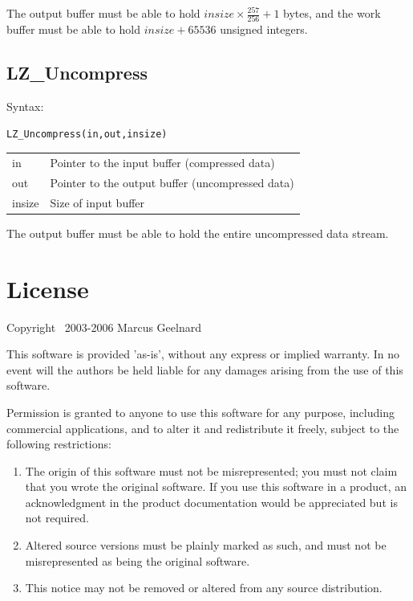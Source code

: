 \documentclass[a4paper,11pt,oneside]{report}
\begin{document}
The output buffer must be able to hold $insize\times\frac{257}{256}+1$ bytes,
and the work buffer must be able to hold $insize+65536$ unsigned
integers.


\section{LZ\_Uncompress}
Syntax:
\begin{lstlisting}
LZ_Uncompress(in,out,insize)
\end{lstlisting}

\begin{tabular}{ll}
in      & Pointer to the input buffer (compressed data)\\
out     & Pointer to the output buffer (uncompressed data)\\
insize  & Size of input buffer
\end{tabular}

The output buffer must be able to hold the entire uncompressed data
stream.


\chapter{License}
\thispagestyle{fancy}
Copyright \textcopyright\ 2003-2006 Marcus Geelnard

This software is provided 'as-is', without any express or implied
warranty. In no event will the authors be held liable for any damages
arising from the use of this software.

Permission is granted to anyone to use this software for any purpose,
including commercial applications, and to alter it and redistribute it
freely, subject to the following restrictions:

\begin{enumerate}
\item The origin of this software must not be misrepresented; you must not
   claim that you wrote the original software. If you use this software
   in a product, an acknowledgment in the product documentation would
   be appreciated but is not required.

\item Altered source versions must be plainly marked as such, and must not
   be misrepresented as being the original software.

\item This notice may not be removed or altered from any source
   distribution.
\end{enumerate}
\end{document}
